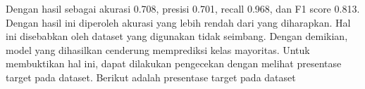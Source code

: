 Dengan hasil sebagai akurasi 0.708, presisi 0.701, recall 0.968, dan F1 score 0.813. Dengan hasil ini diperoleh akurasi yang lebih rendah dari yang diharapkan. Hal ini disebabkan oleh dataset yang digunakan tidak seimbang. Dengan demikian, model yang dihasilkan cenderung memprediksi kelas mayoritas. Untuk membuktikan hal ini, dapat dilakukan pengecekan dengan melihat presentase target pada dataset. Berikut adalah presentase target pada dataset